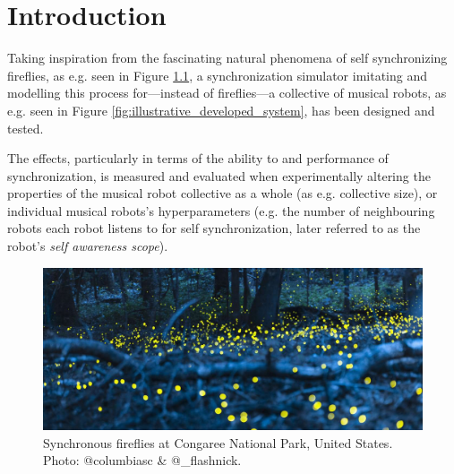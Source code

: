 \chapter{Introduction}
\label{chap:introduction}

Taking inspiration from the fascinating natural phenomena of self synchronizing fireflies, as e.g. seen in Figure \ref{fig:synched_fireflies_phenomenon}, a synchronization simulator imitating and modelling this process for—instead of fireflies—a collective of musical robots, as e.g. seen in Figure \ref{fig:illustrative_developed_system}, has been designed and tested.

The effects, particularly in terms of the ability to and performance of synchronization, is measured and evaluated when experimentally altering the properties of the musical robot collective as a whole (as e.g. collective size), or individual musical robots's hyperparameters (e.g. the number of neighbouring robots each robot listens to for self synchronization, later referred to as the robot's \textit{self awareness scope}).

\begin{figure}[!ht]
	\centering
	\includegraphics[width=\linewidth]{Assets/DocSegments/Chapters/Background/Figures/Photos/synchronized_fireflies_phenomenon.jpg}
	\caption[Picture of fireflies flashing synchronously in a US National Park]{Synchronous fireflies at Congaree National Park, United States. Photo\protect\footnotemark: @columbiasc \& @\_flashnick.} %
	\label{fig:synched_fireflies_phenomenon}
\end{figure}


\np

